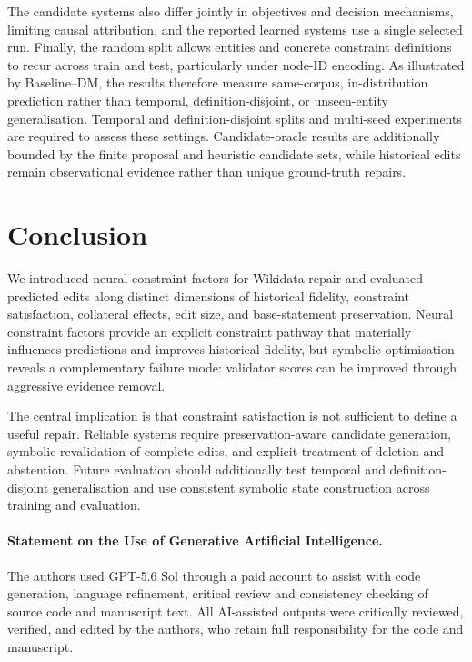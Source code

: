 \documentclass[a4paper,UKenglish,cleveref,autoref,thm-restate]{tgdk-v2021}
\begin{document}
The candidate systems also differ jointly in objectives and decision mechanisms, limiting causal attribution, and the reported learned systems use a single selected run. Finally, the random split allows entities and concrete constraint definitions to recur across train and test, particularly under node-ID encoding. As illustrated by Baseline--DM, the results therefore measure same-corpus, in-distribution prediction rather than temporal, definition-disjoint, or unseen-entity generalisation. Temporal and definition-disjoint splits and multi-seed experiments are required to assess these settings. Candidate-oracle results are additionally bounded by the finite proposal and heuristic candidate sets, while historical edits remain observational evidence rather than unique ground-truth repairs.

\section{Conclusion}
\label{sec:conclusion}

We introduced neural constraint factors for Wikidata repair and evaluated predicted edits along distinct dimensions of historical fidelity, constraint satisfaction, collateral effects, edit size, and base-statement preservation. Neural constraint factors provide an explicit constraint pathway that materially influences predictions and improves historical fidelity, but symbolic optimisation reveals a complementary failure mode: validator scores can be improved through aggressive evidence removal. 

The central implication is that constraint satisfaction is not sufficient to define a useful repair. Reliable systems require preservation-aware candidate generation, symbolic revalidation of complete edits, and explicit treatment of deletion and abstention. Future evaluation should additionally test temporal and definition-disjoint generalisation and use consistent symbolic state construction across training and evaluation.

\paragraph*{Statement on the Use of Generative Artificial Intelligence.}
The authors used GPT-5.6 Sol through a paid account to assist with code generation, language refinement, critical review and consistency checking of source code and manuscript text. All AI-assisted outputs were critically reviewed, verified, and edited by the authors, who retain full responsibility for the code and manuscript.


\end{document}
